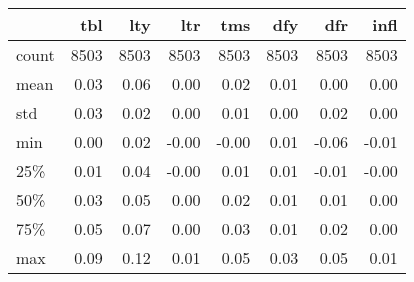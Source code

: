 \begin{tabular}{lrrrrrrr}
  \toprule
  {} &   tbl &   lty &   ltr &   tms &   dfy &   dfr &  infl \\
  \midrule
  count &  8503 &  8503 &  8503 &  8503 &  8503 &  8503 &  8503 \\
  mean  &     0.03 &     0.06 &     0.00 &     0.02 &     0.01 &     0.00 &     0.00 \\
  std   &     0.03 &     0.02 &     0.00 &     0.01 &     0.00 &     0.02 &     0.00 \\
  min   &     0.00 &     0.02 &    -0.00 &    -0.00 &     0.01 &    -0.06 &    -0.01 \\
  25\%   &     0.01 &     0.04 &    -0.00 &     0.01 &     0.01 &    -0.01 &    -0.00 \\
  50\%   &     0.03 &     0.05 &     0.00 &     0.02 &     0.01 &     0.01 &     0.00 \\
  75\%   &     0.05 &     0.07 &     0.00 &     0.03 &     0.01 &     0.02 &     0.00 \\
  max   &     0.09 &     0.12 &     0.01 &     0.05 &     0.03 &     0.05 &     0.01 \\
  \bottomrule
  \end{tabular}
